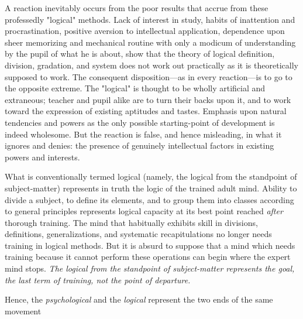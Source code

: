 \documentclass[letterpaper]{book}
\begin{document}
A reaction inevitably occurs from the poor results that accrue from
these professedly "logical" methods. Lack of interest in study, habits
of inattention and procrastination, positive aversion to intellectual
application, dependence upon sheer memorizing and mechanical routine
with only a modicum of understanding by the pupil of what he is about,
show that the theory of logical definition, division, gradation, and
system does not work out practically as it is theoretically supposed to
work. The consequent disposition---as in every reaction---is to go to
the opposite extreme. The "logical" is thought to be wholly artificial
and extraneous; teacher and pupil alike are to turn their backs upon it,
and to work toward the expression of existing aptitudes and tastes.
Emphasis upon natural tendencies and powers as the only possible
starting-point of development is indeed wholesome. But the reaction is
false, and hence misleading, in what it ignores and denies: the presence
of genuinely intellectual factors in existing powers and interests.


What is conventionally termed logical (namely, the logical from the
standpoint of subject-matter) represents in truth the logic of the
trained adult mind. Ability to divide a subject, to define its elements,
and to group them into classes according to general principles
represents logical capacity at its best point reached \emph{after}
thorough training. The mind that habitually exhibits skill in divisions,
definitions, generalizations, and systematic recapitulations no longer
needs training in logical methods. But it is absurd to suppose that a
mind which needs training because it cannot perform these
operations
can begin where the expert mind stops. \emph{The logical from the
standpoint of subject-matter represents the goal, the last term of
training, not the point of departure.}


Hence, the \emph{psychological} and the \emph{logical} represent the two
ends of the same movement
\end{document}
